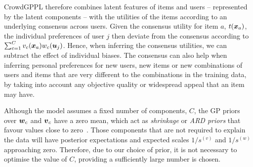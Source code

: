 CrowdGPPL therefore combines latent features of items and
users -- represented by the latent components -- with the
utilities of the items according to an underlying consensus across users.
Given the consensus utility for item $a$, $t(\boldsymbol x_a)$,
the individual preferences of user $j$ then deviate from the consensus according
to $\sum_{c=1}^C  v_c(\boldsymbol x_a) w_c(\boldsymbol u_j)$. 
Hence, when inferring the consensus utilities, we can subtract the effect of individual
biases. The consensus can also help 
when inferring personal preferences for new users, new items or new combinations of users and items that are
very different to the combinations in the training data, by
taking into account any objective quality or widespread appeal that an item may have.

Although the model assumes a fixed number of components, $C$,
the GP priors over $\boldsymbol w_c$ and $\boldsymbol v_c$ have a zero mean, which act as \emph{shrinkage}
or \emph{ARD priors} that favour values close to zero~\citep{mackay1995probable,psorakis2011overlapping}. 
Those components that are not required to explain the data will have posterior
expectations and expected scales $1/s^{(v)}$ and $1/s^{(w)}$ approaching zero.
Therefore, due to our choice of prior, it is not necessary to optimise the value
of $C$, providing a sufficiently large number is chosen. 

